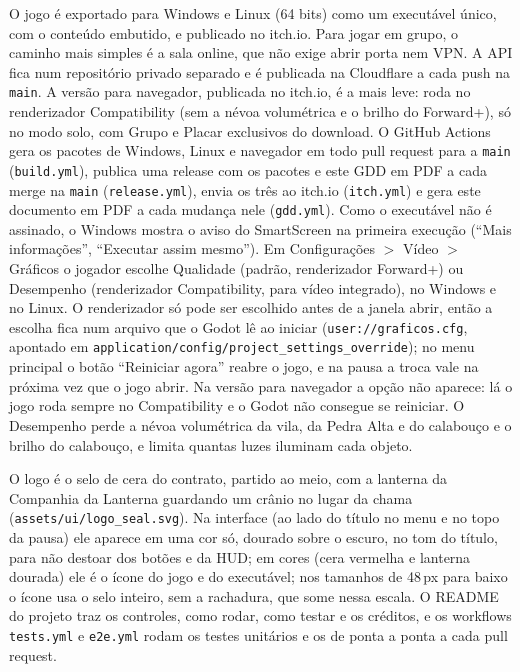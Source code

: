 \documentclass[11pt,a4paper]{article}
\begin{document}
O jogo é exportado para Windows e Linux (64 bits) como um executável único, com o conteúdo embutido, e publicado no itch.io. Para jogar em grupo, o caminho mais simples é a sala online, que não exige abrir porta nem VPN. A API fica num repositório privado separado e é publicada na Cloudflare a cada push na \texttt{main}. A versão para navegador, publicada no itch.io, é a mais leve: roda no renderizador Compatibility (sem a névoa volumétrica e o brilho do Forward+), só no modo solo, com Grupo e Placar exclusivos do download. O GitHub Actions gera os pacotes de Windows, Linux e navegador em todo pull request para a \texttt{main} (\texttt{build.yml}), publica uma release com os pacotes e este GDD em PDF a cada merge na \texttt{main} (\texttt{release.yml}), envia os três ao itch.io (\texttt{itch.yml}) e gera este documento em PDF a cada mudança nele (\texttt{gdd.yml}). Como o executável não é assinado, o Windows mostra o aviso do SmartScreen na primeira execução (``Mais informações'', ``Executar assim mesmo''). Em Configurações $>$ Vídeo $>$ Gráficos o jogador escolhe Qualidade (padrão, renderizador Forward+) ou Desempenho (renderizador Compatibility, para vídeo integrado), no Windows e no Linux. O renderizador só pode ser escolhido antes de a janela abrir, então a escolha fica num arquivo que o Godot lê ao iniciar (\texttt{user://graficos.cfg}, apontado em \texttt{application/config/project\_settings\_override}); no menu principal o botão ``Reiniciar agora'' reabre o jogo, e na pausa a troca vale na próxima vez que o jogo abrir. Na versão para navegador a opção não aparece: lá o jogo roda sempre no Compatibility e o Godot não consegue se reiniciar. O Desempenho perde a névoa volumétrica da vila, da Pedra Alta e do calabouço e o brilho do calabouço, e limita quantas luzes iluminam cada objeto.

O logo é o selo de cera do contrato, partido ao meio, com a lanterna da Companhia da Lanterna guardando um crânio no lugar da chama (\texttt{assets/ui/logo\_seal.svg}). Na interface (ao lado do título no menu e no topo da pausa) ele aparece em uma cor só, dourado sobre o escuro, no tom do título, para não destoar dos botões e da HUD; em cores (cera vermelha e lanterna dourada) ele é o ícone do jogo e do executável; nos tamanhos de 48\,px para baixo o ícone usa o selo inteiro, sem a rachadura, que some nessa escala. O README do projeto traz os controles, como rodar, como testar e os créditos, e os workflows \texttt{tests.yml} e \texttt{e2e.yml} rodam os testes unitários e os de ponta a ponta a cada pull request.
\end{document}
